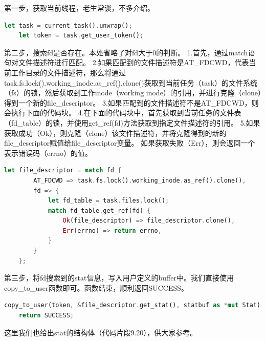 第一步，获取当前线程，老生常谈，不多介绍。
\begin{lstlisting}[language={Rust}, label={code:new_area},
	caption={获取线程}]
    let task = current_task().unwrap();
    let token = task.get_user_token();
\end{lstlisting}
第二步，搜索fd是否存在。本处省略了对fd大于0的判断。
1.首先，通过match语句对文件描述符进行匹配。
2.如果匹配到的文件描述符是AT_FDCWD，代表当前工作目录的文件描述符，那么将通过task.fs.lock().working_inode.as_ref().clone()获取到当前任务（task）的文件系统（fs）的锁，然后获取到工作inode（working inode）的引用，并进行克隆（clone）得到一个新的file_descriptor。
3.如果匹配到的文件描述符不是AT_FDCWD，则会执行下面的代码块。
4.在下面的代码块中，首先获取到当前任务的文件表（fd_table）的锁，并使用get_ref(fd)方法获取到指定文件描述符的引用。
5.如果获取成功（Ok），则克隆（clone）该文件描述符，并将克隆得到的新的file_descriptor赋值给file_descriptor变量。
如果获取失败（Err），则会返回一个表示错误码（errno）的值。
\begin{lstlisting}[language={Rust}, label={code:new_area},
	caption={fd查找}]
    let file_descriptor = match fd {
        AT_FDCWD => task.fs.lock().working_inode.as_ref().clone(),
        fd => {
            let fd_table = task.files.lock();
            match fd_table.get_ref(fd) {
                Ok(file_descriptor) => file_descriptor.clone(),
                Err(errno) => return errno,
            }
        }
    };
\end{lstlisting}
第三步，将fd搜索到的stat信息，写入用户定义的buffer中。我们直接使用copy_to_user函数即可。函数结束，顺利返回SUCCESS。
\begin{lstlisting}[language={Rust}, label={code:new_area},
	caption={赋值stat buffer}]
    copy_to_user(token, &file_descriptor.get_stat(), statbuf as *mut Stat);
    return SUCCESS;
\end{lstlisting}
这里我们也给出stat的结构体（代码片段9.20），供大家参考。